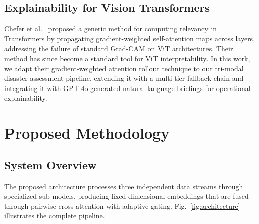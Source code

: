 \documentclass[journal]{IEEEtran}
\begin{document}
\subsection{Explainability for Vision Transformers}

Chefer et al.~\cite{chefer2021transformer} proposed a generic method for computing relevancy in Transformers by propagating gradient-weighted self-attention maps across layers, addressing the failure of standard Grad-CAM on ViT architectures. Their method has since become a standard tool for ViT interpretability. In this work, we adapt their gradient-weighted attention rollout technique to our tri-modal disaster assessment pipeline, extending it with a multi-tier fallback chain and integrating it with GPT-4o-generated natural language briefings for operational explainability.

\section{Proposed Methodology}

\subsection{System Overview}

The proposed architecture processes three independent data streams through specialized sub-models, producing fixed-dimensional embeddings that are fused through pairwise cross-attention with adaptive gating. Fig.~\ref{fig:architecture} illustrates the complete pipeline.
\end{document}
